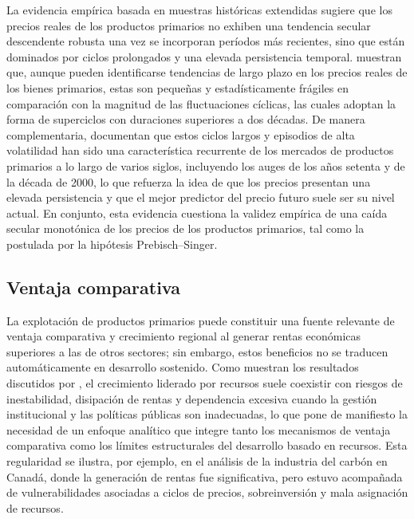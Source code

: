 \documentclass[../../PTFM.tex]{subfiles}
\begin{document}
	La evidencia empírica basada en muestras históricas extendidas sugiere que los precios reales de los productos primarios no exhiben una tendencia secular descendente robusta una vez se incorporan períodos más recientes, sino que están dominados por ciclos prolongados y una elevada persistencia temporal. \textcite{Cashin2002} muestran que, aunque pueden identificarse tendencias de largo plazo en los precios reales de los bienes primarios, estas son pequeñas y estadísticamente frágiles en comparación con la magnitud de las fluctuaciones cíclicas, las cuales adoptan la forma de superciclos con duraciones superiores a dos décadas. De manera complementaria, \textcite{Jacks2011} documentan que estos ciclos largos y episodios de alta volatilidad han sido una característica recurrente de los mercados de productos primarios a lo largo de varios siglos, incluyendo los auges de los años setenta y de la década de 2000, lo que refuerza la idea de que los precios presentan una elevada persistencia y que el mejor predictor del precio futuro suele ser su nivel actual. En conjunto, esta evidencia cuestiona la validez empírica de una caída secular monotónica de los precios de los productos primarios, tal como la postulada por la hipótesis Prebisch--Singer.
	
	\subsection{Ventaja comparativa}
	\label{subsec:ventaja-comparativa}
	
	La explotación de productos primarios puede constituir una fuente relevante de ventaja comparativa y crecimiento regional al generar rentas económicas superiores a las de otros sectores; sin embargo, estos beneficios no se traducen automáticamente en desarrollo sostenido. Como muestran los resultados discutidos por \textcite{Gunton2003}, el crecimiento liderado por recursos suele coexistir con riesgos de inestabilidad, disipación de rentas y dependencia excesiva cuando la gestión institucional y las políticas públicas son inadecuadas, lo que pone de manifiesto la necesidad de un enfoque analítico que integre tanto los mecanismos de ventaja comparativa como los límites estructurales del desarrollo basado en recursos. Esta regularidad se ilustra, por ejemplo, en el análisis de la industria del carbón en Canadá, donde la generación de rentas fue significativa, pero estuvo acompañada de vulnerabilidades asociadas a ciclos de precios, sobreinversión y mala asignación de recursos.
	
\end{document}
